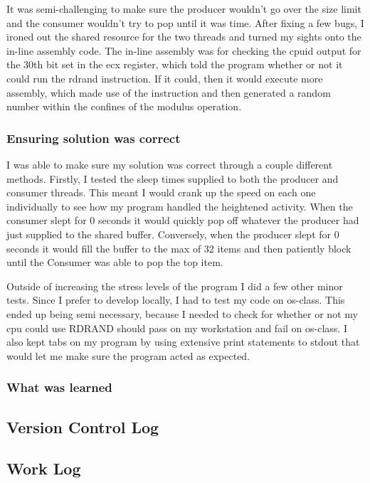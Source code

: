 \documentclass[10pt,draftclsnofoot,onecolumn]{IEEEtran}
\begin{document}
It was semi-challenging to make sure the producer wouldn't go over the size limit and the consumer wouldn't try to pop until it was time.
After fixing a few bugs, I ironed out the shared resource for the two threads and turned my sights onto the in-line assembly code.
The in-line assembly was for checking the cpuid output for the 30th bit set in the ecx register, which told the program whether or not it could run the rdrand instruction.
If it could, then it would execute more assembly, which made use of the instruction and then generated a random number within the confines of the modulus operation.

\subsubsection{Ensuring solution was correct}
I was able to make sure my solution was correct through a couple different methods.
Firstly, I tested the sleep times supplied to both the producer and consumer threads.
This meant I would crank up the speed on each one individually to see how my program handled the heightened activity.
When the consumer slept for 0 seconds it would quickly pop off whatever the producer had just supplied to the shared buffer.
Conversely, when the producer slept for 0 seconds it would fill the buffer to the max of 32 items and then patiently block until the Consumer was able to pop the top item.

Outside of increasing the stress levels of the program I did a few other minor tests.
Since I prefer to develop locally, I had to test my code on os-class.
This ended up being semi necessary, because I needed to check for whether or not my cpu could use RDRAND should pass on my workstation and fail on os-class.
I also kept tabs on my program by using extensive print statements to stdout that would let me make sure the program acted as expected.


\subsubsection{What was learned}



\subsection{Version Control Log}

\subsection{Work Log}

\end{document}
